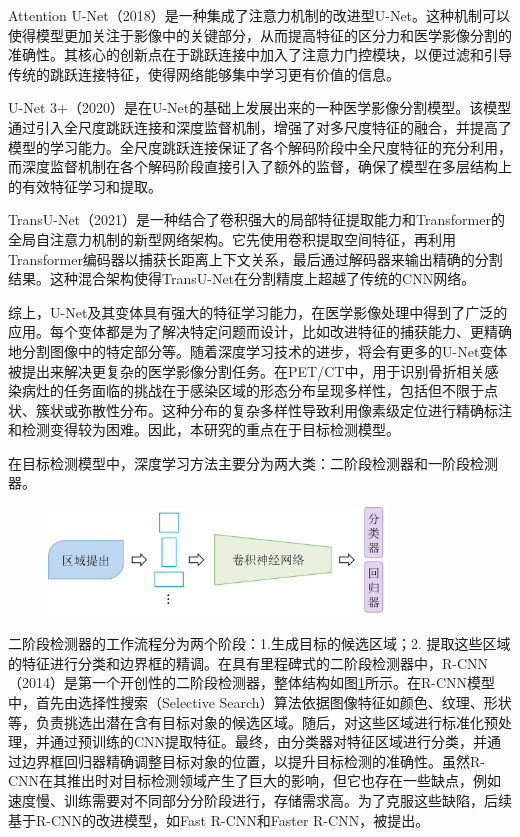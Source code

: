 Attention U-Net\cite{oktay2018attention}（2018）是一种集成了注意力机制的改进型U-Net\cite{ronneberger2015u}。这种机制可以使得模型更加关注于影像中的关键部分，从而提高特征的区分力和医学影像分割的准确性。其核心的创新点在于跳跃连接中加入了注意力门控模块，以便过滤和引导传统的跳跃连接特征，使得网络能够集中学习更有价值的信息。

U-Net 3+\cite{huang2020unet}（2020）是在U-Net的基础上发展出来的一种医学影像分割模型。该模型通过引入全尺度跳跃连接和深度监督机制，增强了对多尺度特征的融合，并提高了模型的学习能力。全尺度跳跃连接保证了各个解码阶段中全尺度特征的充分利用，而深度监督机制在各个解码阶段直接引入了额外的监督，确保了模型在多层结构上的有效特征学习和提取。

TransU-Net\cite{chen2021transunet}（2021）是一种结合了卷积强大的局部特征提取能力和Transformer的全局自注意力机制的新型网络架构。它先使用卷积提取空间特征，再利用Transformer编码器以捕获长距离上下文关系，最后通过解码器来输出精确的分割结果。这种混合架构使得TransU-Net在分割精度上超越了传统的CNN网络。

综上，U-Net及其变体具有强大的特征学习能力，在医学影像处理中得到了广泛的应用。每个变体都是为了解决特定问题而设计，比如改进特征的捕获能力、更精确地分割图像中的特定部分等。随着深度学习技术的进步，将会有更多的U-Net变体被提出来解决更复杂的医学影像分割任务。在PET/CT中，用于识别骨折相关感染病灶的任务面临的挑战在于感染区域的形态分布呈现多样性，包括但不限于点状、簇状或弥散性分布。这种分布的复杂多样性导致利用像素级定位进行精确标注和检测变得较为困难。因此，本研究的重点在于目标检测模型。

在目标检测模型中，深度学习方法主要分为两大类：二阶段检测器和一阶段检测器。

\begin{figure}[htbp]
  \centering
  \includegraphics[width=0.8\textwidth]{figures/chap02_rcnn.jpg}
  \label{fig:chap02_rcnn}
\end{figure}

二阶段检测器的工作流程分为两个阶段：1.生成目标的候选区域；2. 提取这些区域的特征进行分类和边界框的精调。在具有里程碑式的二阶段检测器中，R-CNN\cite{girshick2014rich}（2014）是第一个开创性的二阶段检测器，整体结构如图\ref{fig:chap02_rcnn}所示。在R-CNN模型中，首先由选择性搜索（Selective Search）算法依据图像特征如颜色、纹理、形状等，负责挑选出潜在含有目标对象的候选区域。随后，对这些区域进行标准化预处理，并通过预训练的CNN提取特征。最终，由分类器对特征区域进行分类，并通过边界框回归器精确调整目标对象的位置，以提升目标检测的准确性。虽然R-CNN在其推出时对目标检测领域产生了巨大的影响，但它也存在一些缺点，例如速度慢、训练需要对不同部分分阶段进行，存储需求高。为了克服这些缺陷，后续基于R-CNN的改进模型，如Fast R-CNN\cite{girshick2015fast}和Faster R-CNN\cite{ren2015faster}，被提出。

